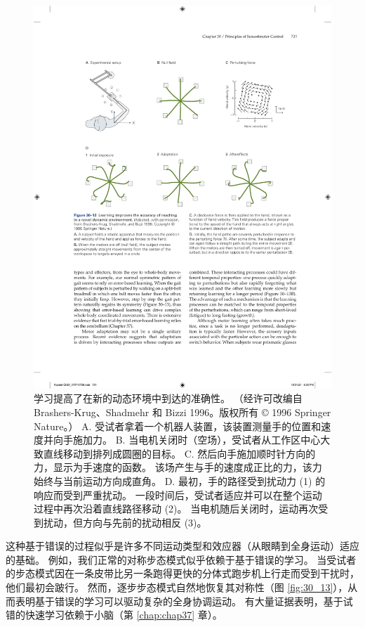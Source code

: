 \begin{figure}[htbp]
	\centering
	\includegraphics[width=0.85\linewidth]{chap30/fig_30_12}
	\caption{学习提高了在新的动态环境中到达的准确性。 （经许可改编自 Brashers-Krug、Shadmehr 和 Bizzi 1996。版权所有 © 1996 Springer Nature。） A. 受试者拿着一个机器人装置，该装置测量手的位置和速度并向手施加力。 B. 当电机关闭时（空场），受试者从工作区中心大致直线移动到排列成圆圈的目标。 C. 然后向手施加顺时针方向的力，显示为手速度的函数。 该场产生与手的速度成正比的力，该力始终与当前运动方向成直角。 D. 最初，手的路径受到扰动力 (1) 的响应而受到严重扰动。 一段时间后，受试者适应并可以在整个运动过程中再次沿着直线路径移动 (2)。 当电机随后关闭时，运动再次受到扰动，但方向与先前的扰动相反 (3)。}
	\label{fig:30_12}
\end{figure}

这种基于错误的过程似乎是许多不同运动类型和效应器（从眼睛到全身运动）适应的基础。 例如，我们正常的对称步态模式似乎依赖于基于错误的学习。 当受试者的步态模式因在一条皮带比另一条跑得更快的分体式跑步机上行走而受到干扰时，他们最初会跛行。 
然而，逐步步态模式自然地恢复其对称性（图 \ref{fig:30_13}），从而表明基于错误的学习可以驱动复杂的全身协调运动。 
有大量证据表明，基于试错的快速学习依赖于小脑（第 \ref{chap:chap37} 章）。

